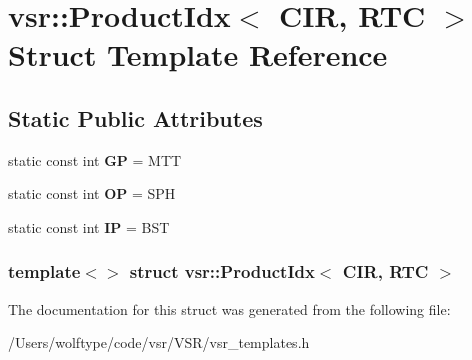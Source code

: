 \hypertarget{structvsr_1_1_product_idx_3_01_c_i_r_00_01_r_t_c_01_4}{\section{vsr\-:\-:Product\-Idx$<$ C\-I\-R, R\-T\-C $>$ Struct Template Reference}
\label{structvsr_1_1_product_idx_3_01_c_i_r_00_01_r_t_c_01_4}
}
\subsection*{Static Public Attributes}
\begin{DoxyCompactItemize}
\item 
\hypertarget{structvsr_1_1_product_idx_3_01_c_i_r_00_01_r_t_c_01_4_a7cac19694060fb1d451ae069c2691ca2}{static const int {\bfseries G\-P} = M\-T\-T}\label{structvsr_1_1_product_idx_3_01_c_i_r_00_01_r_t_c_01_4_a7cac19694060fb1d451ae069c2691ca2}

\item 
\hypertarget{structvsr_1_1_product_idx_3_01_c_i_r_00_01_r_t_c_01_4_a3a62b5b91652ecc5a5598646a79e1dde}{static const int {\bfseries O\-P} = S\-P\-H}\label{structvsr_1_1_product_idx_3_01_c_i_r_00_01_r_t_c_01_4_a3a62b5b91652ecc5a5598646a79e1dde}

\item 
\hypertarget{structvsr_1_1_product_idx_3_01_c_i_r_00_01_r_t_c_01_4_aaf048e0900d90e0e9bd0546fe1bca4e8}{static const int {\bfseries I\-P} = B\-S\-T}\label{structvsr_1_1_product_idx_3_01_c_i_r_00_01_r_t_c_01_4_aaf048e0900d90e0e9bd0546fe1bca4e8}

\end{DoxyCompactItemize}
\subsubsection*{template$<$$>$ struct vsr\-::\-Product\-Idx$<$ C\-I\-R, R\-T\-C $>$}



The documentation for this struct was generated from the following file\-:\begin{DoxyCompactItemize}
\item 
/\-Users/wolftype/code/vsr/\-V\-S\-R/vsr\-\_\-templates.\-h\end{DoxyCompactItemize}
